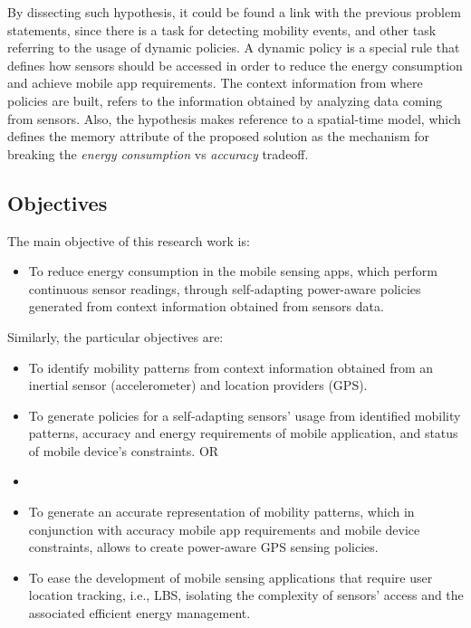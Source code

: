 \documentclass[ENG,PhD]{cinvestav}
\begin{document}
By dissecting such hypothesis, it could be found a link with the previous problem statements, since there is a task for detecting mobility events, and other task referring to the usage of dynamic policies.
A dynamic policy is a special rule that defines how sensors should be accessed in order to reduce the energy consumption and achieve mobile app requirements. 
The context information from where policies are built, refers to the information obtained by analyzing data coming from sensors.
Also, the hypothesis makes reference to a spatial-time model, which defines the memory attribute of the proposed solution as the mechanism for breaking the \emph{energy consumption} vs \emph{accuracy} tradeoff.


\subsection{Objectives}
The main objective of this research work is:
\begin{itemize}
  \item To reduce energy consumption in the mobile sensing apps, which perform continuous sensor readings, through self-adapting power-aware policies generated from context information obtained from sensors data.
\end{itemize}

Similarly, the particular objectives are:
\begin{itemize}
  \item To identify mobility patterns from context information obtained from an inertial sensor (accelerometer) and location providers (GPS).
  \item To generate policies for a self-adapting sensors' usage from identified mobility patterns, accuracy and energy requirements of mobile application, and status of mobile device's constraints.  OR
  \item \item To generate an accurate representation of mobility patterns, which in conjunction with accuracy mobile app requirements and mobile device constraints, allows to create power-aware GPS sensing policies.
  \item To ease the development of mobile sensing applications that require user location tracking, i.e., LBS, isolating the complexity of sensors' access and the associated efficient energy management.
\end{itemize}
\end{document}
